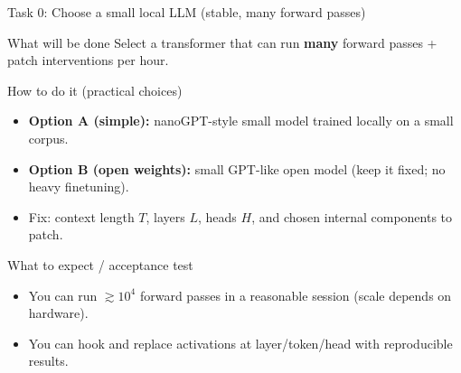\documentclass[aspectratio=169,xcolor={dvipsnames}]{beamer}
\renewcommand{\accent}[1]{\textbf{#1}}
\begin{document}
\begin{frame}[shrink=20]{Task 0: Choose a small local LLM (stable, many forward passes)}
\small
\begin{block}{What will be done}
Select a transformer that can run \accent{many} forward passes + patch interventions per hour.
\end{block}

\begin{block}{How to do it (practical choices)}
\begin{itemize}\setlength\itemsep{3pt}
\item \accent{Option A (simple):} nanoGPT-style small model trained locally on a small corpus.
\item \accent{Option B (open weights):} small GPT-like open model (keep it fixed; no heavy finetuning).
\item Fix: context length $T$, layers $L$, heads $H$, and chosen internal components to patch.
\end{itemize}
\end{block}

\begin{block}{What to expect / acceptance test}
\begin{itemize}\setlength\itemsep{2pt}
\item You can run $\gtrsim 10^4$ forward passes in a reasonable session (scale depends on hardware).
\item You can hook and replace activations at layer/token/head with reproducible results.
\end{itemize}
\end{block}
\end{frame}
\end{document}
